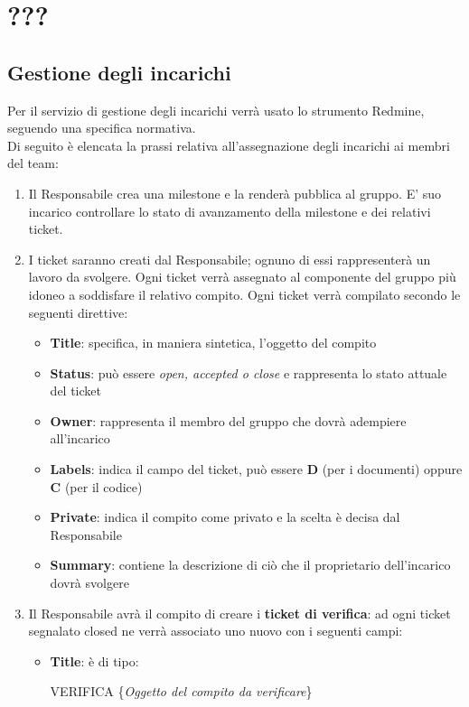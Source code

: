 \section{???}{
	\subsection{Gestione degli incarichi}{
		Per il servizio di gestione degli incarichi verrà usato lo strumento Redmine, seguendo una specifica normativa.\\Di seguito è elencata la prassi relativa all’assegnazione degli incarichi ai membri del team:
		\begin{enumerate}
			\item Il Responsabile crea una milestone e la renderà pubblica al gruppo. E’ suo incarico controllare lo stato di avanzamento della milestone e dei relativi ticket.
			\item I ticket saranno creati dal Responsabile; ognuno di essi rappresenterà un lavoro da svolgere. Ogni ticket verrà assegnato al componente del gruppo più idoneo a soddisfare il relativo compito. Ogni ticket verrà compilato secondo le seguenti direttive:
			\begin{itemize}
				\item \textbf{Title}: specifica, in maniera sintetica, l’oggetto del compito
				\item \textbf{Status}: può essere \emph{open, accepted o close} e rappresenta lo stato attuale del ticket
				\item \textbf{Owner}: rappresenta il membro del gruppo che dovrà adempiere all'incarico
				\item \textbf{Labels}: indica il campo del ticket, può essere \textbf{D} (per i documenti) oppure \textbf{C} (per il codice)
				\item \textbf{Private}: indica il compito come privato e la scelta è decisa dal Responsabile
				\item \textbf{Summary}: contiene la descrizione di ciò che il proprietario dell’incarico dovrà svolgere
			\end{itemize}
			\item Il Responsabile avrà  il compito di  creare i \textbf{ticket di verifica}: ad ogni ticket segnalato closed ne verrà associato uno nuovo con i seguenti campi:
			\begin{itemize}
				\item \textbf{Title}: è di tipo: \begin{center}
				VERIFICA \{\emph{Oggetto del compito da verificare}\}

\end{center}
\end{itemize}
\end{enumerate}}}
